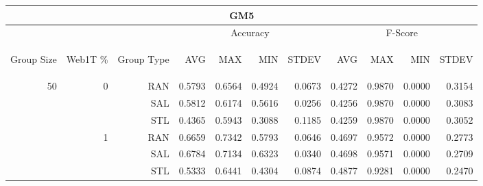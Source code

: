 \begin{center}
\begin{table}[htbp] 
 \begin{center}
\begin{tabular}{ | r | r | r | r | r | r | r | r | r | r | r |}
\hline
\multicolumn{11}{|c|}{GM5}\\
\hline
 & & & \multicolumn{4}{|c|}{Accuracy} & \multicolumn{4}{|c|}{F-Score}\\ \cline{4-11}
\begin{sideways}Group Size\end{sideways} & \begin{sideways}Web1T \%\end{sideways} & \begin{sideways}Group Type\end{sideways} & \begin{sideways}AVG\end{sideways} & \begin{sideways}MAX\end{sideways} & \begin{sideways}MIN\end{sideways} & \begin{sideways}STDEV\end{sideways} & \begin{sideways}AVG\end{sideways} & \begin{sideways}MAX\end{sideways} & \begin{sideways}MIN\end{sideways} & \begin{sideways}STDEV\end{sideways}\\
\hline
\multirow{9}{*}{50}
 & \multirow{3}{*}{0} & RAN & 0.5793 & 0.6564 & 0.4924 & 0.0673 & 0.4272 & 0.9870 & 0.0000 & 0.3154\\ \cline{3-11}
 &   & SAL & 0.5812 & 0.6174 & 0.5616 & 0.0256 & 0.4256 & 0.9870 & 0.0000 & 0.3083\\ \cline{3-11}
 &   & STL & 0.4365 & 0.5943 & 0.3088 & 0.1185 & 0.4259 & 0.9870 & 0.0000 & 0.3052\\ \cline{2-11}
 & \multirow{3}{*}{1} & RAN & 0.6659 & 0.7342 & 0.5793 & 0.0646 & 0.4697 & 0.9572 & 0.0000 & 0.2773\\ \cline{3-11}
 &   & SAL & 0.6784 & 0.7134 & 0.6323 & 0.0340 & 0.4698 & 0.9571 & 0.0000 & 0.2709\\ \cline{3-11}
 &   & STL & 0.5333 & 0.6441 & 0.4304 & 0.0874 & 0.4877 & 0.9281 & 0.0000 & 0.2470\\ \cline{2-11}

\end{tabular}
\end{center}
\end{table}
\end{center}
